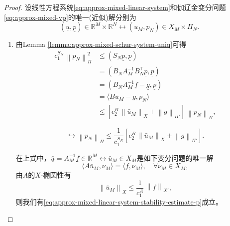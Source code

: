 \begin{proof}
  设线性方程系统\eqref{eq:approx-mixed-linear-system}和伽辽金变分问题\eqref{eq:approx-mixed-vp}的唯一(近似)解分别为
  \begin{equation*}
    \left( \underline{u}, \underline{p} \right) \in \mathbb{R}^{M} \times \mathbb{R}^{N}
    \leftrightarrow \left( u_{M}, p_{N} \right) \in X_{M} \times \Pi_{N}.
  \end{equation*}

  \begin{enumerate}
  \item 由Lemma \ref{lemma:approx-mixed-schur-system-uniq}可得
  \begin{equation*}
    \begin{split}
      c_{1}^{S_{N}} \, \left\| p_{N} \right\|_{\Pi}^{2}
      & \le \left( S_{N} \underline{p}, \underline{p} \right) \\
      & = \left( B_{N} A_{M}^{-1} B_{N}^{\top} \underline{p}, \underline{p} \right) \\
      & = \left( B_{N} A_{M}^{-1} \underline{f} - \underline{g}, \underline{p} \right) \\
      & = \langle B \bar{u}_{M} - g, p_{N} \rangle \\
      & \le \left[
      c_{2}^{B} \, \left\| \bar{u}_{M} \right\|_{X} + \left\| g \right\|_{\Pi'}
      \right] \,
      \left\| p_{N} \right\|_{\Pi},
    \end{split}
  \end{equation*}

  \begin{equation*}
    \hookrightarrow \left\| p_{N} \right\|_{\Pi}
    \le \frac{1}{c_{1}^{S_{N}}}
    \left[
    c_{2}^{B} \, \left\| \bar{u}_{M} \right\|_{X} + \left\| g \right\|_{\Pi'}
    \right].
  \end{equation*}

  在上式中，$\underline{\bar{u}} = A_{M}^{-1} \underline{f} \in \mathbb{R}^{M} \leftrightarrow \bar{u}_{M} \in X_{M}$是如下变分问题的唯一解
  \begin{equation*}
    \langle A \bar{u}_{M}, \nu_{M} \rangle = \langle f, \nu_{M} \rangle, \quad \forall \nu_{M} \in X_{M},
  \end{equation*}
  由$A$的$X$-椭圆性有
  \begin{equation*}
    \left\| \bar{u}_{M} \right\|_{X} \le \frac{1}{c_{1}^{A}} \, \left\|f \right\|_{X'},
  \end{equation*}
  则我们有\eqref{eq:approx-mixed-linear-system-stability-estimate-p}成立。


\end{enumerate}
\end{proof}
